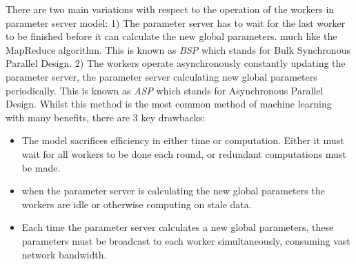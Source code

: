 There are two main variations with respect to the operation of the workers in
parameter server model: 1) The parameter server has to wait for the last worker
to be finished before it can calculate the new global parameters. much like the
MapReduce algorithm. \cite{googlemapreduce2008} This is known as \textit{BSP}
which stands for Bulk Synchronous Parallel Design.  2) The workers operate
asynchronously constantly updating the parameter server, the parameter server
calculating new global parameters periodically. \cite{Qirong2013SSP} This is known as
\textit{ASP} which stands for Asynchronous Parallel Design. Whilst this
method is the most common method of machine learning with many benefits, there
are 3 key drawbacks:
\begin{itemize}
    \item The model sacrifices efficiency in either time or computation. Either
    it must wait for all workers to be done each round, or redundant
    computations must be made. \cite{Chilimbi2014ADAM}
    \item when the parameter server is calculating the new global parameters the
    workers are idle or otherwise computing on stale data. 
    \cite{Verbraeken2020MLSurvey}
    \item Each time the parameter server calculates a new global parameters,
    these parameters must be broadcast to each worker simultaneously, consuming
    vast network bandwidth. \cite{LI2014ParameterServers}
\end{itemize}

\par

